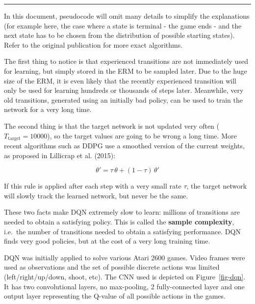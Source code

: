\documentclass[
  letterpaper,
  DIV=11,
  numbers=noendperiod]{scrreprt}
\begin{document}
\begin{center}\rule{0.5\linewidth}{0.5pt}\end{center}

In this document, pseudocode will omit many details to simplify the
explanations (for example here, the case where a state is terminal - the
game ends - and the next state has to be chosen from the distribution of
possible starting states). Refer to the original publication for more
exact algorithms.

The first thing to notice is that experienced transitions are not
immediately used for learning, but simply stored in the ERM to be
sampled later. Due to the huge size of the ERM, it is even likely that
the recently experienced transition will only be used for learning
hundreds or thousands of steps later. Meanwhile, very old transitions,
generated using an initially bad policy, can be used to train the
network for a very long time.

The second thing is that the target network is not updated very often
(\(T_\text{target}=10000\)), so the target values are going to be wrong
a long time. More recent algorithms such as DDPG use a smoothed version
of the current weights, as proposed in Lillicrap et al. (2015):

\[
    \theta' = \tau \, \theta + (1-\tau) \, \theta'
\]

If this rule is applied after each step with a very small rate \(\tau\),
the target network will slowly track the learned network, but never be
the same.

These two facts make DQN extremely slow to learn: millions of
transitions are needed to obtain a satisfying policy. This is called the
\textbf{sample complexity}, i.e.~the number of transitions needed to
obtain a satisfying performance. DQN finds very good policies, but at
the cost of a very long training time.

DQN was initially applied to solve various Atari 2600 games. Video
frames were used as observations and the set of possible discrete
actions was limited (left/right/up/down, shoot, etc). The CNN used is
depicted on Figure~\ref{fig-dqn}. It has two convolutional layers, no
max-pooling, 2 fully-connected layer and one output layer representing
the Q-value of all possible actions in the games.
\end{document}
